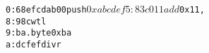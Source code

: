 \begin{alltt}
   0:	68 ef cd ab 00       	push   $0xabcdef
   5:	83 c0 11             	add    $0x11,%eax
   8:	98                   	cwtl   
   9:	ba                   	.byte 0xba
   a:	dc fe                	fdivr  %st,%st(6)
\end{alltt}
